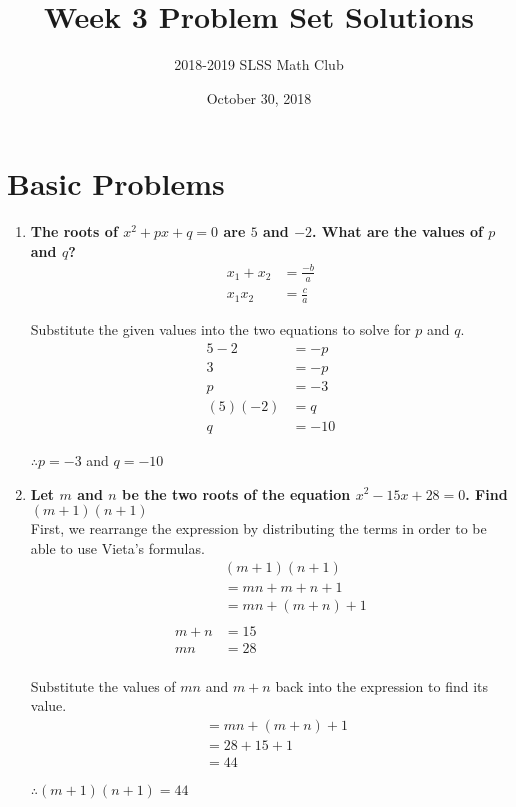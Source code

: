 \documentclass[12pt]{article}
\title{Week 3 Problem Set Solutions\vspace{-3mm}}
\author{2018-2019 SLSS Math Club \vspace{-5mm}}
\date{October 30, 2018 \vspace{-5mm}}
\begin{document}
\maketitle 

\section*{Basic Problems}
\begin{enumerate}
    \item \textbf{The roots of $x^2 + px + q = 0$ are $5$ and $-2$. What are the values of $p$ and $q$?}
    \begin{align*}
        x_1+x_2&=\frac{-b}{a} \\
        x_1x_2&=\frac{c}{a}
    \end{align*}
    
    Substitute the given values into the two equations to solve for $p$ and $q$.
    \begin{align*}
        5-2&=-p \\
        3&=-p \\
        p&=-3 \\
        (5)(-2)&=q \\
        q&=-10
    \end{align*}
    
    $\therefore p = -3$ and $q = -10$
    
    \item \textbf{Let $m$ and $n$ be the two roots of the equation $x^2 - 15x + 28 = 0$. Find $(m + 1)(n + 1)$} \\
    
    First, we rearrange the expression by distributing the terms in order to be able to use Vieta's formulas.
    \begin{align*}
        &(m+1)(n+1) \\
        &=mn+m+n+1 \\
        &=mn+(m+n)+1 \\ \\
        m+n&=15 \\
        mn&=28 \\
    \end{align*}
    
    Substitute the values of $mn$ and $m+n$ back into the expression to find its value.
    \begin{align*}
        &=mn+(m+n)+1 \\
        &=28+15+1 \\
        &=44
    \end{align*}
    
    $\therefore (m+1)(n+1)=44$
    
\end{enumerate}
\end{document}

